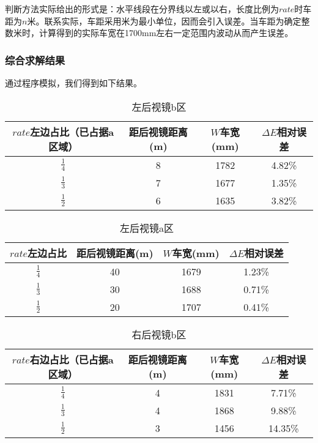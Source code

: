 \documentclass[bwprint]{cumcmthesis}
\begin{document}
\par 判断方法实际给出的形式是：水平线段在分界线以左或以右，长度比例为$rate$时车距为$n$米。联系实际，车距采用米为最小单位，因而会引入误差。当车距为确定整数米时，计算得到的实际车宽在1700mm左右一定范围内波动从而产生误差。

\subsubsection{综合求解结果}

通过程序模拟，我们得到如下结果。

\begin{table}[!htbp]
\centering
\caption{左后视镜b区}
\label{左后视镜b区}
\begin{tabular}{cccc}
\toprule
 $rate$左边占比（已占据a区域）  &  距后视镜距离(m) &  $W$车宽(mm) &  $\Delta E$相对误差  \\ \midrule
$\frac{1}{4}$ & 8 & 1782 & 4.82\% \\
$\frac{1}{3}$ & 7 & 1677 & 1.35\% \\
$\frac{1}{2}$ & 6 & 1635 & 3.82\% \\
\bottomrule 
\end{tabular}
\end{table}

\begin{table}[!htbp]
\centering
\caption{左后视镜a区}
\label{左后视镜a区}
\begin{tabular}{cccc}
\toprule
$rate$左边占比 & 距后视镜距离(m) & $W$车宽(mm) & $\Delta E$相对误差  \\ \midrule
$\frac{1}{4}$ & 40 & 1679 & 1.23\% \\
$\frac{1}{3}$ & 30 & 1688 & 0.71\% \\
$\frac{1}{2}$ & 20 & 1707 & 0.41\% \\
\bottomrule 
\end{tabular}
\end{table}

\begin{table}[!htbp]
\centering
\caption{右后视镜b区}
\label{右后视镜b区}
\begin{tabular}{cccc}
\toprule
$rate$右边占比（已占据a区域）& 距后视镜距离(m) & $W$车宽(mm) & $\Delta E$相对误差  \\ \midrule
$\frac{1}{4}$ & 4 & 1831 & 7.71\% \\
$\frac{1}{3}$ & 4 & 1868 & 9.88\% \\
$\frac{1}{2}$ & 3 & 1456 & 14.35\% \\
\bottomrule 
\end{tabular}
\end{table}
\end{document}
